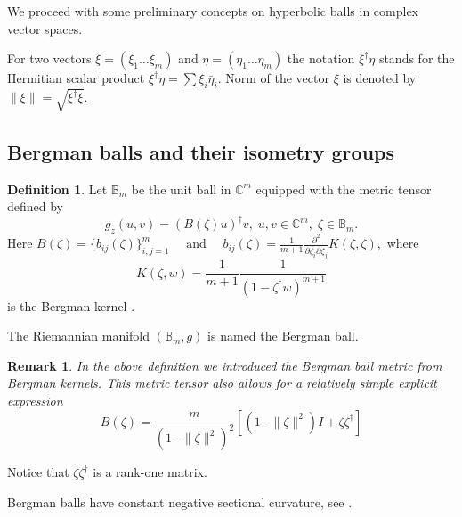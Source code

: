 \documentclass{article}
\theoremstyle{plain}%
\newtheorem{rem}{Remark}
\theoremstyle{definition}
\newtheorem{definition}{Definition}
\theoremstyle{remark}
\theoremstyle{prop}
\begin{document}
We proceed with some preliminary concepts on hyperbolic balls in complex vector spaces.

For two vectors $\xi=(\xi_1 \dots \xi_m)$ and $\eta = (\eta_1 \dots \eta_m)$ the notation $\xi^\dagger \eta$ stands for the Hermitian scalar product $\xi^\dagger \eta = \sum \xi_i \bar \eta_i$. Norm of the vector $\xi$ is denoted by $\| \xi \| = \sqrt{\xi^\dagger \xi}$.

\subsection{Bergman balls and their isometry groups}


\begin{definition}
Let $\mathbb{B}_m$ be the unit ball in $\mathbb{C}^m$ equipped with the metric tensor defined by 
$$
g_z(u,v) = (B(\zeta)u)^\dagger v, \; u, v\in \mathbb{C}^m, \; \zeta \in \mathbb{B}_m.
$$
Here $
B(\zeta)=\{ b_{ij}(\zeta) \}_{i,j=1}^m \quad \mbox{ and } \quad b_{ij}(\zeta)= \frac{1}{m+1}\frac{\partial^2}{\partial \overline{{\zeta_i}}\partial \zeta_j}K(\zeta,\zeta),
$ 
where 
$$
K(\zeta,w)=\frac{1}{m+1}\frac{1}{(1- \zeta^\dagger w)^{m+1}}
$$ 
is the Bergman kernel \cite{kobayashi,kezu}.

The Riemannian manifold $(\mathbb{B}_m, g)$ is named the Bergman  ball.
\end{definition}

\begin{rem}
In the above definition we introduced the Bergman ball metric from Bergman kernels. This metric tensor also allows for a relatively simple explicit expression \cite{Rudin}
\begin{equation}
\label{Bergman_matric}
B(\zeta) = \frac{m}{(1 -\| \zeta \|^2)^2} \left[ (1 - \| \zeta \|^2) I + \zeta \zeta^\dagger \right]
\end{equation}
\end{rem}
Notice that $\zeta \zeta^\dagger$ is a rank-one matrix.

Bergman balls have constant negative sectional curvature, see \cite{HL}.
\end{document}
